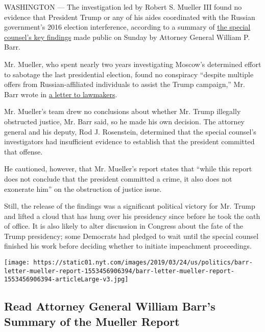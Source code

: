 WASHINGTON --- The investigation led by Robert S. Mueller III found no
evidence that President Trump or any of his aides coordinated with the
Russian government's 2016 election interference, according to a summary
of
\href{https://www.nytimes.com/interactive/2019/03/24/us/politics/barr-letter-mueller-report.html}{the
special counsel's key findings} made public on Sunday by Attorney
General William P. Barr.

Mr. Mueller, who spent nearly two years investigating Moscow's
determined effort to sabotage the last presidential election, found no
conspiracy ``despite multiple offers from Russian-affiliated individuals
to assist the Trump campaign,'' Mr. Barr wrote in
\href{https://www.nytimes.com/interactive/2019/03/24/us/politics/barr-letter-mueller-report.html}{a
letter to lawmakers}.

Mr. Mueller's team drew no conclusions about whether Mr. Trump illegally
obstructed justice, Mr. Barr said, so he made his own decision. The
attorney general and his deputy, Rod J. Rosenstein, determined that the
special counsel's investigators had insufficient evidence to establish
that the president committed that offense.

He cautioned, however, that Mr. Mueller's report states that ``while
this report does not conclude that the president committed a crime, it
also does not exonerate him'' on the obstruction of justice issue.

Still, the release of the findings was a significant political victory
for Mr. Trump and lifted a cloud that has hung over his presidency since
before he took the oath of office. It is also likely to alter discussion
in Congress about the fate of the Trump presidency; some Democrats had
pledged to wait until the special counsel finished his work before
deciding whether to initiate impeachment proceedings.

\href{https://www.nytimes.com/interactive/2019/03/24/us/politics/barr-letter-mueller-report.html}{}

\texttt{[image: https://static01.nyt.com/images/2019/03/24/us/politics/barr-letter-mueller-report-1553456906394/barr-letter-mueller-report-1553456906394-articleLarge-v3.jpg]}

\hypertarget{read-attorney-general-william-barrs-summary-of-the-mueller-report}{%
\subsection{Read Attorney General William Barr's Summary of the Mueller
Report}\label{read-attorney-general-william-barrs-summary-of-the-mueller-report}}

